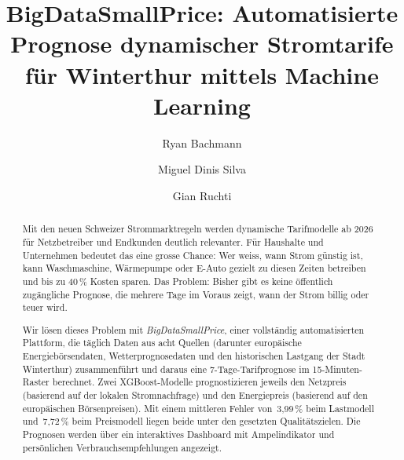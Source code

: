 \documentclass[sigconf]{acmart}
\begin{document}

\title{BigDataSmallPrice: Automatisierte Prognose dynamischer Stromtarife
       f\"ur Winterthur mittels Machine Learning}

\author{Ryan Bachmann}

\author{Miguel Dinis Silva}

\author{Gian Ruchti}

\renewcommand{\shortauthors}{Ryan Bachmann, Miguel Dinis Silva, Gian Ruchti}

\begin{abstract}
Mit den neuen Schweizer Strommarktregeln werden dynamische Tarifmodelle ab 2026
f\"ur Netzbetreiber und Endkunden deutlich relevanter.
F\"ur Haushalte und Unternehmen bedeutet das eine grosse Chance: Wer weiss, wann
Strom g\"unstig ist, kann Waschmaschine, W\"armepumpe oder E-Auto gezielt zu
diesen Zeiten betreiben und bis zu 40\,\% Kosten sparen.
Das Problem: Bisher gibt es keine \"offentlich zug\"angliche Prognose, die mehrere
Tage im Voraus zeigt, wann der Strom billig oder teuer wird.

Wir l\"osen dieses Problem mit \emph{BigDataSmallPrice}, einer vollst\"andig
automatisierten Plattform, die t\"aglich Daten aus acht Quellen (darunter
europ\"aische Energieb\"orsendaten, Wetterprognosedaten und den historischen
Lastgang der Stadt Winterthur) zusammenf\"uhrt und daraus eine
7-Tage-Tarifprognose im 15-Minuten-Raster berechnet.
Zwei XGBoost-Modelle prognostizieren jeweils den Netzpreis (basierend auf der
lokalen Stromnachfrage) und den Energiepreis (basierend auf den europ\"aischen
B\"orsenpreisen).
Mit einem mittleren Fehler von~3{,}99\,\% beim Lastmodell und~7{,}72\,\%
beim Preismodell liegen beide unter den gesetzten Qualit\"atszielen.
Die Prognosen werden \"uber ein interaktives Dashboard mit Ampelindikator und
pers\"onlichen Verbrauchsempfehlungen angezeigt.
\end{abstract}

\maketitle
\pagestyle{fancy}
\fancyhf{}
\fancyfoot[C]{\thepage}
\end{document}
